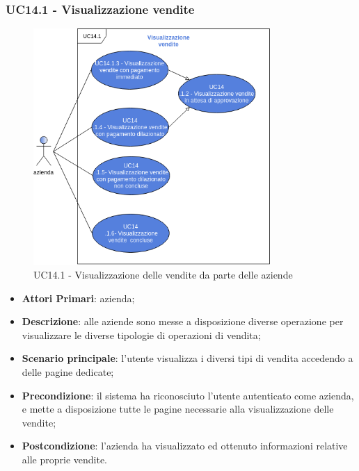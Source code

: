 \subsubsection{UC14.1 - Visualizzazione vendite}
\begin{figure}[H]
	\includegraphics[width=9cm]{res/images/UC14-VisualizzazioneVendite.png}
	\centering
	\caption{UC14.1 - Visualizzazione delle vendite da parte delle aziende}
\end{figure}
\begin{itemize}
	\item \textbf{Attori Primari}: azienda;
	\item \textbf{Descrizione}: alle aziende sono messe a disposizione diverse operazione per visualizzare le diverse tipologie di operazioni di vendita; 
	\item \textbf{Scenario principale}: l'utente visualizza i diversi tipi di vendita accedendo a delle pagine dedicate;
	\item \textbf{Precondizione}: il sistema ha riconosciuto l'utente autenticato come azienda, e mette a disposizione tutte le pagine necessarie alla visualizzazione delle vendite;
	\item \textbf{Postcondizione}: l'azienda ha visualizzato ed ottenuto informazioni relative alle proprie vendite.
\end{itemize} 

